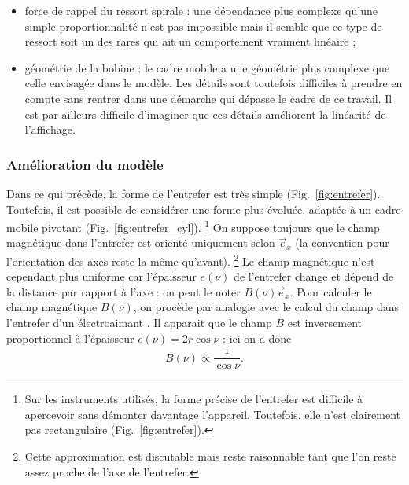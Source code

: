 \documentclass[12pt,a4paper,fleqn]{article}
\newcommand{\ex}{\vec{e}_x}
\begin{document}
\begin{itemize}
\item force de rappel du ressort spirale : une dépendance plus complexe qu'une simple proportionnalité n'est pas impossible mais il semble que ce type de ressort soit un des rares qui ait un \og comportement vraiment linéaire \fg{} \cite{wiki_ressort} ;

\item géométrie de la bobine : le cadre mobile a une géométrie plus complexe que celle envisagée dans le modèle.
Les détails sont toutefois difficiles à prendre en compte sans rentrer dans une démarche qui dépasse le cadre de ce travail.
Il est par ailleurs difficile d'imaginer que ces détails améliorent la linéarité de l'affichage.
\end{itemize}

\subsubsection{Amélioration du modèle}

Dans ce qui précède, la forme de l'entrefer est très simple (Fig.~\ref{fig:entrefer}).
Toutefois, il est possible de considérer une forme plus évoluée, adaptée à un cadre mobile pivotant (Fig.~\ref{fig:entrefer_cyl}).
\footnote{Sur les instruments utilisés, la forme précise de l'entrefer est difficile à apercevoir sans démonter davantage l'appareil.
Toutefois, elle n'est clairement pas rectangulaire (Fig.~\ref{fig:entrefer}).}
On suppose toujours que le champ magnétique dans l'entrefer est orienté uniquement selon $\ex$ (la convention pour l'orientation des axes reste la même qu'avant).
\footnote{Cette approximation est discutable mais reste raisonnable tant que l'on reste assez proche de l'axe de l'entrefer.}
Le champ magnétique n'est cependant plus uniforme car l'épaisseur $e(\nu)$ de l'entrefer change et dépend de la distance par rapport à l'axe : on peut le noter $B(\nu)\ex$.
Pour calculer le champ magnétique $B(\nu)$, on procède par analogie avec le calcul du champ dans l'entrefer d'un électroaimant \cite{Faroux1998}.
Il apparait que le champ $B$ est inversement proportionnel à l'épaisseur $e(\nu)=2r\cos\nu$ : ici on a donc
\begin{equation}
B(\nu) \propto \frac{1}{\cos\nu}.
\end{equation}
\end{document}
